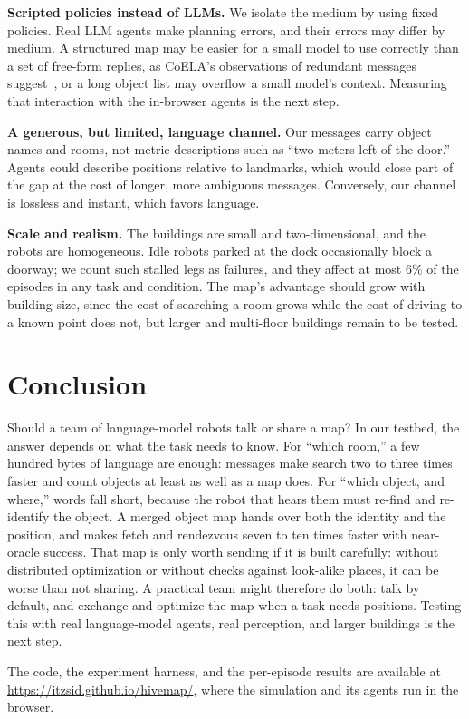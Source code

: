\documentclass[conference]{IEEEtran}
\begin{document}
\textbf{Scripted policies instead of LLMs.}
We isolate the medium by using fixed policies.
Real LLM agents make planning errors, and their errors may differ by medium.
A structured map may be easier for a small model to use correctly than a set of free-form replies, as CoELA's observations of redundant messages suggest~\cite{zhang2024coela}, or a long object list may overflow a small model's context.
Measuring that interaction with the in-browser agents is the next step.

\textbf{A generous, but limited, language channel.}
Our messages carry object names and rooms, not metric descriptions such as ``two meters left of the door.''
Agents could describe positions relative to landmarks, which would close part of the gap at the cost of longer, more ambiguous messages.
Conversely, our channel is lossless and instant, which favors language.

\textbf{Scale and realism.}
The buildings are small and two-dimensional, and the robots are homogeneous.
Idle robots parked at the dock occasionally block a doorway; we count such stalled legs as failures, and they affect at most 6\% of the episodes in any task and condition.
The map's advantage should grow with building size, since the cost of searching a room grows while the cost of driving to a known point does not, but larger and multi-floor buildings remain to be tested.

\section{Conclusion}\label{sec:conclusion}

Should a team of language-model robots talk or share a map?
In our testbed, the answer depends on what the task needs to know.
For ``which room,'' a few hundred bytes of language are enough: messages make search two to three times faster and count objects at least as well as a map does.
For ``which object, and where,'' words fall short, because the robot that hears them must re-find and re-identify the object.
A merged object map hands over both the identity and the position, and makes fetch and rendezvous seven to ten times faster with near-oracle success.
That map is only worth sending if it is built carefully: without distributed optimization or without checks against look-alike places, it can be worse than not sharing.
A practical team might therefore do both: talk by default, and exchange and optimize the map when a task needs positions.
Testing this with real language-model agents, real perception, and larger buildings is the next step.

The code, the experiment harness, and the per-episode results are available at \url{https://itzsid.github.io/hivemap/}, where the simulation and its agents run in the browser.



\end{document}
